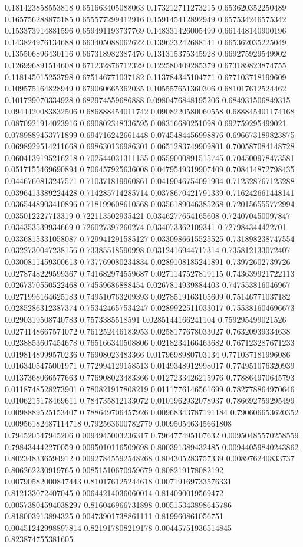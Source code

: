 \begin{table}
\begin{tabu}
\begin{sparkline}{10}
0.181423858553818 0.651663405088063 0.173212711273215 0.653620352250489 0.165756288875185 0.655577299412916 0.159145412892949 0.657534246575342 0.153373914881596 0.659491193737769 0.148331426005499 0.661448140900196 0.143824976134688 0.663405088062622 0.139623242688141 0.665362035225049 0.135506896430116 0.667318982387476 0.131315375345928 0.669275929549902 0.126996891514608 0.671232876712329 0.122580409285379 0.673189823874755 0.118145015253798 0.675146771037182 0.113784345104771 0.677103718199609 0.109575164828949 0.679060665362035 0.105557651360306 0.681017612524462 0.101729070334928 0.682974559686888 0.0980476848195206 0.684931506849315 0.0944420083832506 0.686888454011742 0.0908220580060558 0.688845401174168 0.0870921914023916 0.690802348336595 0.08316680251098 0.692759295499021 0.0789889453771899 0.694716242661448 0.0745484456998876 0.696673189823875 0.0698929514211668 0.698630136986301 0.0651283749909801 0.700587084148728 0.0604139195216218 0.702544031311155 0.0559000891515745 0.704500978473581 0.0517155469690894 0.706457925636008 0.0479549319907409 0.708414872798435 0.0446760813247571 0.710371819960861 0.0419046754091904 0.712328767123288 0.0396413389224428 0.714285714285714 0.0378670421791339 0.716242661448141 0.0365448903410896 0.718199608610568 0.0356189046385268 0.720156555772994 0.035012227713319 0.722113502935421 0.0346277654165608 0.724070450097847 0.034353539934669 0.726027397260274 0.034073362109341 0.727984344422701 0.0336815331058087 0.729941291585127 0.0330986615525525 0.731898238747554 0.0322730047238156 0.73385518590998 0.0312416944717314 0.735812133072407 0.0300811459300613 0.737769080234834 0.0289108185241891 0.73972602739726 0.0278748229599367 0.741682974559687 0.0271147527819115 0.743639921722113 0.0267370550522468 0.74559686888454 0.0267814939884403 0.747553816046967 0.0271996164625183 0.749510763209393 0.0278519163105609 0.75146771037182 0.0285286312387374 0.753424657534247 0.0289922511033017 0.755381604696673 0.0290319508740783 0.7573385518591 0.0285144166241104 0.759295499021526 0.0274148667574072 0.761252446183953 0.0258177678033027 0.76320939334638 0.0238853607454678 0.765166340508806 0.0218234166463682 0.767123287671233 0.0198148999570236 0.76908023483366 0.0179698980703134 0.771037181996086 0.0163405475001971 0.772994129158513 0.0149348912998017 0.774951076320939 0.0137368066577663 0.776908023483366 0.0127233426215976 0.778864970645793 0.0118748528273901 0.780821917808219 0.0111776146561699 0.782778864970646 0.0106215178469611 0.784735812133072 0.0101962932078937 0.786692759295499 0.0098889525153407 0.788649706457926 0.00968343787191184 0.790606653620352 0.00956182487114718 0.792563600782779 0.00950546345661808 0.794520547945206 0.0094945003236317 0.796477495107632 0.00950485570258559 0.798434442270059 0.0095010116509698 0.800391389432485 0.00944059840243862 0.802348336594912 0.00927845592548268 0.804305283757339 0.008976240833737 0.806262230919765 0.00851510670959679 0.808219178082192 0.00790582000847443 0.810176125244618 0.00719169733576331 0.812133072407045 0.00644214036060014 0.814090019569472 0.00573804594038297 0.816046966731898 0.00515343898645786 0.818003913894325 0.00473901738861111 0.819960861056751 0.00451242998897814 0.821917808219178 0.00445751936514845 0.823874755381605 
\end{sparkline}
\end{tabu}
\end{table}
